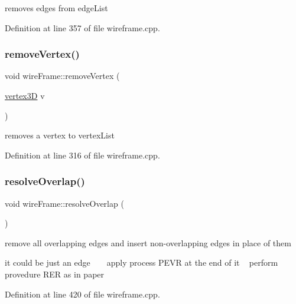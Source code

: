 removes edges from edge\+List

Definition at line 357 of file wireframe.\+cpp.

\mbox{\label{classwire_frame_a8b4634def9827d37ae165dbeec1363e7}} 
\subsubsection{\texorpdfstring{remove\+Vertex()}{removeVertex()}}
{\footnotesize\ttfamily void wire\+Frame\+::remove\+Vertex (\begin{DoxyParamCaption}\item[{\mbox{\hyperlink{structvertex3_d}{vertex3D}}}]{v }\end{DoxyParamCaption})}

removes a vertex to vertex\+List

Definition at line 316 of file wireframe.\+cpp.

\mbox{\label{classwire_frame_adaca5f3e21a232ad7eef8135b2e470dd}} 
\subsubsection{\texorpdfstring{resolve\+Overlap()}{resolveOverlap()}}
{\footnotesize\ttfamily void wire\+Frame\+::resolve\+Overlap (\begin{DoxyParamCaption}{ }\end{DoxyParamCaption})}



remove all overlapping edges and insert non-\/overlapping edges in place of them 

it could be just an edge ~\newline
~\newline
apply process P\+E\+VR at the end of it ~\newline
perform provedure R\+ER as in paper 

Definition at line 420 of file wireframe.\+cpp.

